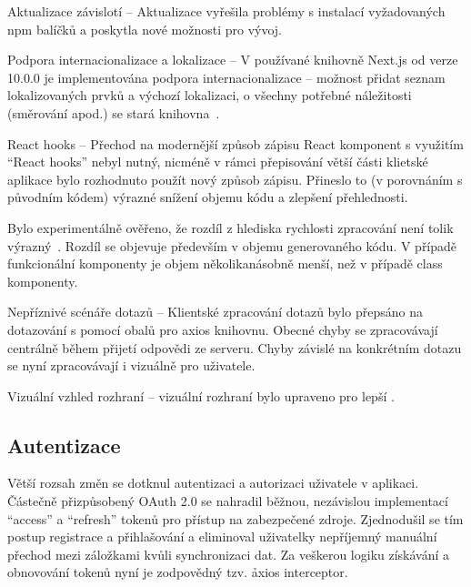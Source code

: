 \begin{dl}
   \item[Aktualizace závislotí] – Aktualizace vyřešila problémy s instalací vyžadovaných npm balíčků a poskytla nové možnosti pro vývoj.

   \item[Podpora internacionalizace a lokalizace] – V používané knihovně Next.js od verze 10.0.0 je implementována podpora internacionalizace – možnost přidat seznam lokalizovaných prvků a výchozí lokalizaci, o všechny potřebné náležitosti (směrování apod.) se stará knihovna~\cite{nextjsi18n}.

   \item[React hooks] –
   Přechod na modernější způsob zápisu React komponent s využitím \enquote{React hooks} nebyl nutný, nicméně v rámci přepisování větší části klietské aplikace bylo rozhodnuto použít nový způsob zápisu.
   Přineslo to (v porovnáním s původním kódem) výrazné snížení objemu kódu a zlepšení přehlednosti.

   Bylo experimentálně ověřeno, že rozdíl z hlediska rychlosti zpracování není tolik výrazný~\cite{reacthooksdiff}.
   Rozdíl se objevuje především v objemu generovaného kódu.
   V případě funkcionální komponenty je objem několikanásobně menší, než v případě class komponenty.

   \item[Nepříznivé scénáře \g{API} dotazů] – Klientské zpracování  dotazů bylo přepsáno na dotazování s pomocí obalů pro axios knihovnu.
   Obecné chyby se zpracovávají centrálně během přijetí odpovědi ze serveru.
   Chyby závislé na konkrétním dotazu se nyní zpracovávají i vizuálně pro uživatele.

   \item[Vizuální vzhled rozhraní] – vizuální rozhraní bylo upraveno pro lepší .
\end{dl}



\subsection{Autentizace}\label{sec:client-auth}

Větší rozsah změn se dotknul autentizaci a autorizaci uživatele v aplikaci.
Částečně přizpůsobený OAuth 2.0 se nahradil běžnou, nezávislou implementací \enquote{access} a \enquote{refresh} tokenů pro přístup na zabezpečené zdroje.
Zjednodušil se tím postup registrace a přihlašování a eliminoval uživatelky nepříjemný manuální přechod mezi záložkami kvůli synchronizaci dat.
Za veškerou logiku získávání a obnovování tokenů nyní je zodpovědný tzv. \h{axios interceptor}.

